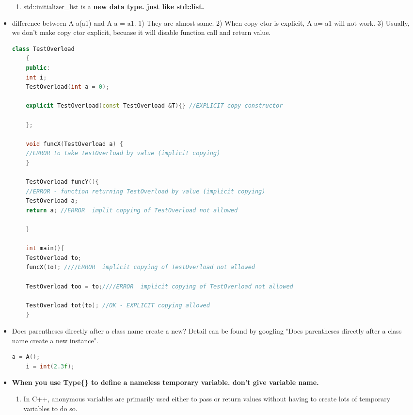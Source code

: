 \documentclass[a4paper,12pt,twoside]{book}
\begin{document}
\begin{itemize}
\begin{enumerate}
		\item std::initializer\_list is a \textbf{new data type. just like std::list.}
	\end{enumerate}
	
	\item difference between A a(a1) and A a = a1.  1) They are almost same. 2) When copy ctor is explicit,  A a= a1 will not work. 3) Usually, we don't make copy ctor explicit, becuase it will disable function call and return value. 
	
	\begin{lstlisting}[frame=single, language=c++]
	class TestOverload
	{
	public:
	int i;
	TestOverload(int a = 0);
	
	explicit TestOverload(const TestOverload &T){} //EXPLICIT copy constructor
	
	};
	
	void funcX(TestOverload a) {
	//ERROR to take TestOverload by value (implicit copying)	
	}
	
	TestOverload funcY(){ 
	//ERROR - function returning TestOverload by value (implicit copying)
	TestOverload a;
	return a; //ERROR  implit copying of TestOverload not allowed
	
	}
	
	int main(){
	TestOverload to;
	funcX(to); ////ERROR  implicit copying of TestOverload not allowed
	
	TestOverload too = to;////ERROR  implicit copying of TestOverload not allowed
	
	TestOverload tot(to); //OK - EXPLICIT copying allowed
	}
	\end{lstlisting}
	
	
	
	\item Does parentheses directly after a class name create a new? Detail can be found by googling "Does parentheses directly after a class name create a new instance".
	\begin{lstlisting}[frame=single, language=c++]
	a = A();
	i = int(2.3f);
	\end{lstlisting}
	
	\item \textbf{When you use Type\{\} to define a nameless temporary variable.  don't give variable name.}
	
	\begin{enumerate}
		\item In C++, anonymous variables are primarily used either to pass or return values without having to create lots of temporary variables to do so.
		

\end{enumerate}
\end{itemize}
\end{document}

